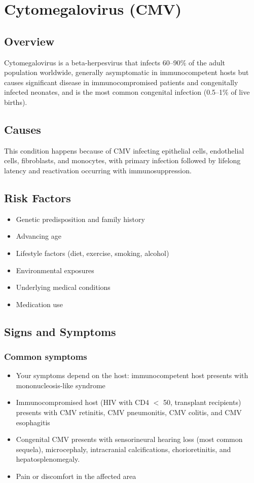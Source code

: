\chapter{Cytomegalovirus (CMV)}
\label{sec:Cytomegalovirus}

\section{Overview}
Cytomegalovirus is a beta-herpesvirus that infects 60--90\% of the adult population worldwide, generally asymptomatic in immunocompetent hosts but causes significant disease in immunocompromised patients and congenitally infected neonates, and is the most common congenital infection (0.5--1\% of live births).
\section{Causes}
This condition happens because of CMV infecting epithelial cells, endothelial cells, fibroblasts, and monocytes, with primary infection followed by lifelong latency and reactivation occurring with immunosuppression.     
\section{Risk Factors}

\begin{itemize}[noitemsep]
  \item Genetic predisposition and family history
  \item Advancing age
  \item Lifestyle factors (diet, exercise, smoking, alcohol)
  \item Environmental exposures
  \item Underlying medical conditions
  \item Medication use
\end{itemize}
\section{Signs and Symptoms}

\subsection{Common symptoms}
\begin{itemize}[noitemsep]
  \item Your symptoms depend on the host: immunocompetent host presents with mononucleosis-like syndrome
  \item Immunocompromised host (HIV with CD4 $<$ 50, transplant recipients) presents with CMV retinitis, CMV pneumonitis, CMV colitis, and CMV esophagitis
  \item Congenital CMV presents with sensorineural hearing loss (most common sequela), microcephaly, intracranial calcifications, chorioretinitis, and hepatosplenomegaly.
  \item Pain or discomfort in the affected area
  \end{itemize}

